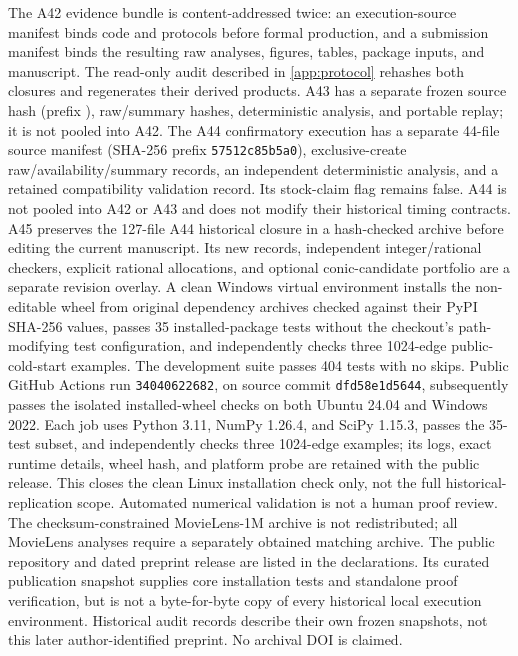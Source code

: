 \documentclass[smallextended,envcountsect]{svjour3}
\begin{document}
The A42 evidence bundle is content-addressed twice: an execution-source manifest
binds code and protocols before formal production, and a submission manifest
binds the resulting raw analyses, figures, tables, package inputs, and
manuscript.  The read-only audit described in \cref{app:protocol} rehashes both
closures and regenerates their derived products.  A43 has a separate frozen
source hash (prefix \texttt{\AFThreeSourceHashShort}), raw/summary hashes,
deterministic analysis, and portable replay; it is not pooled into A42.  The
A44 confirmatory execution has a separate 44-file source manifest (SHA-256
prefix \texttt{57512c85b5a0}), exclusive-create raw/availability/summary
records, an independent deterministic analysis, and a retained compatibility
validation record.  Its stock-claim flag remains false.  A44 is not pooled
into A42 or A43 and does not modify their historical timing contracts. A45
preserves the 127-file A44 historical closure in a hash-checked archive before
editing the current manuscript. Its new records, independent integer/rational
checkers, explicit rational allocations, and optional conic-candidate portfolio
are a separate revision overlay. A clean Windows virtual environment installs
the non-editable wheel from original dependency archives checked against their
PyPI SHA-256 values, passes 35 installed-package tests without the checkout's
path-modifying test configuration, and independently checks three 1024-edge
public-cold-start examples. The development suite passes 404 tests with no
skips. Public GitHub Actions run \texttt{34040622682}, on source commit
\texttt{dfd58e1d5644}, subsequently passes the isolated installed-wheel checks
on both Ubuntu 24.04 and Windows 2022. Each job uses Python 3.11, NumPy 1.26.4,
and SciPy 1.15.3, passes the 35-test subset, and independently checks three
1024-edge examples; its logs, exact runtime details, wheel hash, and platform
probe are retained with the public release. This closes the clean Linux
installation check only, not the full historical-replication scope. Automated
numerical validation is not a human proof review. The
checksum-constrained MovieLens-1M archive is not redistributed; all MovieLens
analyses require a separately obtained matching archive. The public repository
and dated preprint release are listed in the declarations. Its curated
publication snapshot supplies core installation tests and standalone proof
verification, but is not a byte-for-byte copy of every historical local
execution environment. Historical audit records describe their own frozen
snapshots, not this later author-identified preprint. No archival DOI is claimed.
\end{document}
